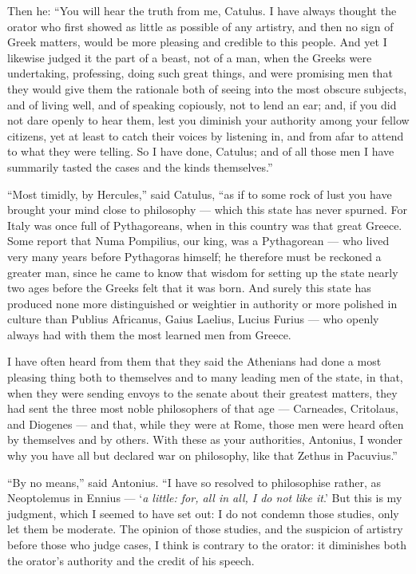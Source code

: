  Then he: ``You will hear the truth from me, Catulus. I have always thought the orator who first showed as little as possible of any artistry, and then no sign of Greek matters, would be more pleasing and credible to this people. And yet I likewise judged it the part of a beast, not of a man, when the Greeks were undertaking, professing, doing such great things, and were promising men that they would give them the rationale both of seeing into the most obscure subjects, and of living well, and of speaking copiously, not to lend an ear; and, if you did not dare openly to hear them, lest you diminish your authority among your fellow citizens, yet at least to catch their voices by listening in, and from afar to attend to what they were telling. So I have done, Catulus; and of all those men I have summarily tasted the cases and the kinds themselves.''

 ``Most timidly, by Hercules,'' said Catulus, ``as if to some rock of lust you have brought your mind close to philosophy — which this state has never spurned. For Italy was once full of Pythagoreans, when in this country was that great Greece. Some report that Numa Pompilius, our king, was a Pythagorean — who lived very many years before Pythagoras himself; he therefore must be reckoned a greater man, since he came to know that wisdom for setting up the state nearly two ages before the Greeks felt that it was born. And surely this state has produced none more distinguished or weightier in authority or more polished in culture than Publius Africanus, Gaius Laelius, Lucius Furius — who openly always had with them the most learned men from Greece.

 I have often heard from them that they said the Athenians had done a most pleasing thing both to themselves and to many leading men of the state, in that, when they were sending envoys to the senate about their greatest matters, they had sent the three most noble philosophers of that age — Carneades, Critolaus, and Diogenes — and that, while they were at Rome, those men were heard often by themselves and by others. With these as your authorities, Antonius, I wonder why you have all but declared war on philosophy, like that Zethus in Pacuvius.''

 ``By no means,'' said Antonius. ``I have so resolved to philosophise rather, as Neoptolemus in Ennius — `\textit{a little: for, all in all, I do not like it}.' But this is my judgment, which I seemed to have set out: I do not condemn those studies, only let them be moderate. The opinion of those studies, and the suspicion of artistry before those who judge cases, I think is contrary to the orator: it diminishes both the orator's authority and the credit of his speech.

